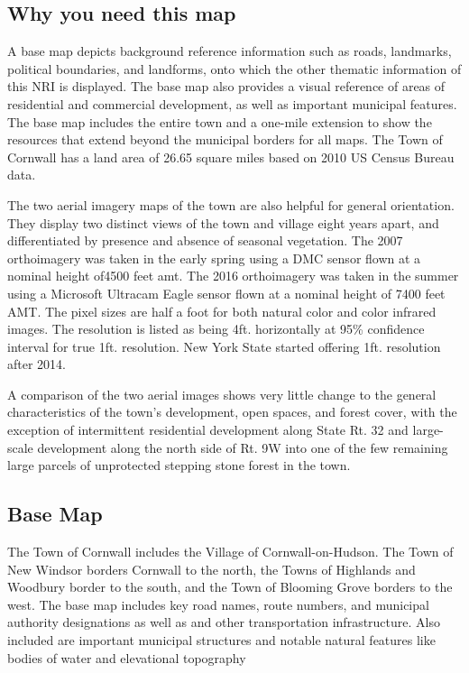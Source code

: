 \subsection*{Why you need this map}
A base map depicts background reference information such as roads, landmarks, 
political boundaries, and landforms, onto which the other thematic information 
of this NRI is displayed. The base map also provides a visual reference of 
areas of residential and commercial development, as well as important municipal 
features. The base map includes the entire town and a one-mile extension to 
show the resources that extend beyond the municipal borders for all maps. The 
Town of Cornwall has a land area of 26.65 square miles based on 2010 US Census 
Bureau data. 
\par
The two aerial imagery maps of the town are also helpful for general 
orientation. They display two distinct views of the town and village eight 
years apart, and differentiated by presence and absence of seasonal vegetation. 
The 2007 orthoimagery was taken in the early spring using a DMC sensor flown at 
a nominal height of4500 feet \gls{amt}. The 2016 orthoimagery was taken in the 
summer using a Microsoft Ultracam Eagle sensor flown at a nominal height of 
7400 feet AMT. The pixel sizes are half a foot for both natural color and color 
infrared images. The resolution is listed as being 4ft. horizontally at 95\% 
confidence interval for true 1ft. resolution. New York State started offering 
1ft. resolution after 2014.
\par
A comparison of the two aerial images shows very little change to the general 
characteristics of the town’s development, open spaces, and forest cover, with 
the exception of intermittent residential development along State Rt. 32 and 
large-scale development along the north side of Rt. 9W into one of the few 
remaining large parcels of unprotected stepping stone forest in the town. 

\subsection*{Base Map}\label{subsec:basemap}
The Town of Cornwall includes the Village of Cornwall-on-Hudson. The Town of 
New Windsor borders Cornwall to the north, the Towns of Highlands and Woodbury 
border to the south, and the Town of Blooming Grove borders to the west. The 
base map includes key road names, route numbers, and municipal authority 
designations as well as and other transportation infrastructure. Also included 
are important municipal structures and notable natural features like bodies of 
water and elevational topography

